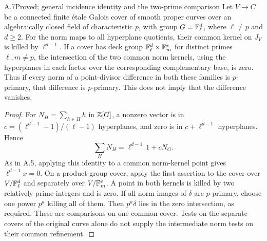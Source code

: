 \begin{claim}{A.7}{Proved; general incidence identity and the two-prime comparison}
Let $V\to C$ be a connected finite \'etale Galois cover of smooth
proper curves over an algebraically closed field of characteristic
$p$, with group $G=\mathbb F_\ell^d$, where $\ell\ne p$ and $d\geq2$.
For the norm maps to all hyperplane quotients, their common kernel
on $J_V$ is killed by $\ell^{d-1}$. If a cover has deck group
$\mathbb F_\ell^d\times\mathbb F_m^e$ for distinct primes $\ell,m\ne p$,
the intersection of the two common norm kernels, using the
hyperplanes in each factor over the corresponding complementary
base, is zero. Thus if every norm of a point-divisor difference in
both these families is $p$-primary, that difference is $p$-primary.
This does not imply that the difference vanishes.
\end{claim}
\begin{proof}
For $N_H=\sum_{h\in H}h$ in $\mathbb Z[G]$, a nonzero vector is in
$c=(\ell^{d-1}-1)/(\ell-1)$ hyperplanes, and zero is in
$c+\ell^{d-1}$ hyperplanes. Hence
\[
 \sum_HN_H=\ell^{d-1}\,1+cN_G.
\]
As in A.5, applying this identity to a common norm-kernel point
gives $\ell^{d-1}x=0$. On a product-group cover, apply the first
assertion to the cover over $V/\mathbb F_\ell^d$ and separately over
$V/\mathbb F_m^e$. A point in both kernels is killed by two relatively
prime integers and is zero. If all norm images of $\delta$ are
$p$-primary, choose one power $p^a$ killing all of them.
Then $p^a\delta$ lies in the zero intersection, as required.
These are comparisons on one common cover. Tests on the separate
covers of the original curve alone do not supply the intermediate
norm tests on their common refinement.
\end{proof}

